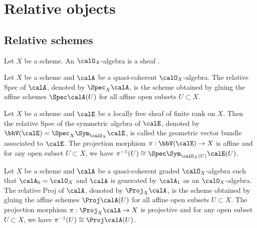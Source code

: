 \section{Relative objects}

\subsection{Relative schemes}

    \begin{definition}\label{def:O_X_algebras_and_graded_O_X_algebras}
        Let \(X\) be a scheme.
        An \(\calO_X\)-algebra is a sheaf .
    \end{definition}

    \begin{definition}\label{def:relative_Spec}
        Let \(X\) be a scheme and \(\calA\) be a quasi-coherent \(\calO_X\)-algebra.
        The relative Spec of \(\calA\), denoted by \(\Spec_X \calA\), is the scheme obtained by gluing the affine schemes \(\Spec \calA(U)\) for all affine open subsets \(U \subset X\).
    \end{definition}

    \begin{proposition}\label{prop:geometric_vector_bundles}
        Let \(X\) be a scheme and \(\calE\) be a locally free sheaf of finite rank on \(X\).
        Then the relative Spec of the symmetric algebra of \(\calE\), denoted by \(\bbV(\calE) = \Spec_X \Sym_{\calO_X} \calE\), is called the geometric vector bundle associated to \(\calE\).
        The projection morphism \(\pi : \bbV(\calE) \to X\) is affine and for any open subset \(U \subset X\), we have \(\pi^{-1}(U) \cong \Spec \Sym_{\calO_X(U)} \calE(U)\).
    \end{proposition}

    \begin{definition}\label{def:relative_Proj}
        Let \(X\) be a scheme and \(\calA\) be a quasi-coherent graded \(\calO_X\)-algebra such that \(\calA_0 = \calO_X\) and \(\calA\) is generated by \(\calA_1\) as an \(\calO_X\)-algebra.
        The relative Proj of \(\calA\), denoted by \(\Proj_X \calA\), is the scheme obtained by gluing the affine schemes \(\Proj \calA(U)\) for all affine open subsets \(U \subset X\).
        The projection morphism \(\pi : \Proj_X \calA \to X\) is projective and for any open subset \(U \subset X\), we have \(\pi^{-1}(U) \cong \Proj \calA(U)\).
    \end{definition}

